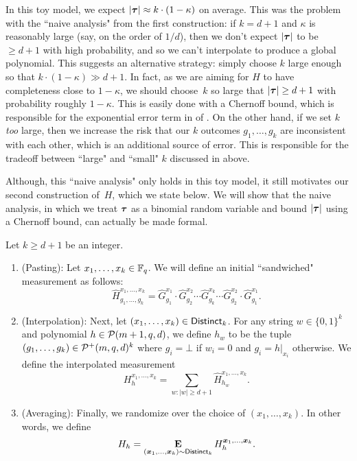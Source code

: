 In this toy model,
we expect $|\boldsymbol{\tau}| \approx k \cdot (1-\kappa)$ on average.
This was the problem with the ``naive analysis" from the first construction:
if $k = d+1$ and $\kappa$ is reasonably large (say, on the order of $1/d$),
then we don't expect $|\boldsymbol{\tau}|$ to be $\geq d+1$ with high probability,
and so we can't interpolate to produce a global polynomial.
This suggests an alternative strategy:
simply choose $k$ large enough so that $k \cdot (1 - \kappa) \gg d+1$.
In fact, as we are aiming for $H$ to have completeness close to $1-\kappa$,
we should choose~$k$ so large that $|\boldsymbol{\tau}| \geq d+1$ with probability 
roughly $1-\kappa$.
This is easily done with a Chernoff bound,
which is responsible for the exponential error term in 
of .
On the other hand, if we set $k$ \emph{too} large,
then we increase the risk that our $k$ outcomes $g_1, \ldots, g_k$ are inconsistent with each other,
which is an additional source of error.
This is responsible for the tradeoff between ``large" and ``small" $k$ discussed in  above.


Although, this ``naive analysis" only holds in this toy model,
it still motivates our second construction of~$H$,
which we state below.
We will show that the naive analysis,
in which we treat $\boldsymbol{\tau}$ as a binomial random variable
and bound $|\boldsymbol{\tau}|$ using a Chernoff bound,
can actually be made formal.

\begin{definition}
Let $k \geq d+1$ be an integer.
\begin{enumerate}
\item (Pasting):
Let $x_1, \ldots, x_k \in \mathbb F_q$.
We will define an initial ``sandwiched" measurement as follows:
\begin{equation*}
\widehat{H}^{x_1, \ldots, x_{k}}_{g_1, \ldots, g_{k}} = \widehat{G}^{x_1}_{g_1} \cdot \widehat{G}^{x_2}_{g_2} \cdots \widehat{G}^{x_{k}}_{g_{k}} \cdots \widehat{G}^{x_2}_{g_2} \cdot \widehat{G}^{x_1}_{g_1}.
\end{equation*}
\item (Interpolation):
Next, let $(x_1, \ldots, x_{k}) \in \mathsf{Distinct}_{k}$.
For any string $w \in \{0, 1\}^k$ and polynomial $h \in \mathcal{P}(m+1, q, d)$,
we define $h_w$  to be the tuple $(g_1, \ldots, g_k)  \in \mathcal{P}^+(m, q, d)^k$
where $g_i = \bot$ if $w_i = 0$ and $g_i = h|_{x_i}$ otherwise.
We define the interpolated measurement
\begin{equation*}
H^{x_1, \ldots, x_{k}}_{h}
= \sum_{w : |w| \geq d+1} \widehat{H}^{x_1, \ldots, x_{k}}_{h_w}.
\end{equation*}
\item (Averaging):
Finally, we randomize over the choice of $(x_1, \ldots, x_{k})$. In other words, we define
\begin{equation*}
H_{h} = \mathop{\bf E\/}_{({\boldsymbol{x}}_1, \ldots, {\boldsymbol{x}}_{k}) \sim \mathsf{Distinct}_{k}} H^{{\boldsymbol{x}}_1, \ldots, {\boldsymbol{x}}_{k}}_h.
\end{equation*}
\end{enumerate}
\end{definition}

